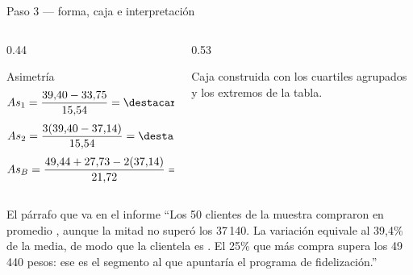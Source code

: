 \documentclass[aspectratio=169,10pt]{beamer}
\newcommand{\cajahor}[8]{%
  \draw[#8,thick] (#2*#1,#7) -- (#3*#1,#7);
  \draw[#8,thick] (#5*#1,#7) -- (#6*#1,#7);
  \draw[#8,thick] (#2*#1,#7-0.16) -- (#2*#1,#7+0.16);
  \draw[#8,thick] (#6*#1,#7-0.16) -- (#6*#1,#7+0.16);
  \draw[#8,thick,fill=#8!18] (#3*#1,#7-0.28) rectangle (#5*#1,#7+0.28);
  \draw[#8,very thick] (#4*#1,#7-0.28) -- (#4*#1,#7+0.28);
}
\begin{document}
\begin{frame}{Paso 3 — forma, caja e interpretación}
  \scriptsize
  \begin{columns}[T,onlytextwidth]
    \begin{column}{0.44\textwidth}
      \begin{block}{Asimetría}
        \scriptsize
        \[ As_1 = \frac{39{,}40-33{,}75}{15{,}54} = \destacar{0{,}364} \]
        \[ As_2 = \frac{3(39{,}40-37{,}14)}{15{,}54} = \destacar{0{,}436} \]
        \[ As_B = \frac{49{,}44+27{,}73-2(37{,}14)}{21{,}72}
                = \destacar{0{,}133} \]
      \end{block}
    \end{column}
    \begin{column}{0.53\textwidth}
      \centering
      {\tiny\color{uniGris} Caja construida con los cuartiles agrupados y los
      extremos de la tabla.}
    \end{column}
  \end{columns}

  \vspace{0.05cm}
  \begin{alertblock}{El párrafo que va en el informe}
    \tiny
    ``Los 50 clientes de la muestra compraron en promedio , aunque la mitad no superó los 37\,140. La variación equivale al
    39,4\% de la media, de modo que la clientela es
    . El 25\% que más compra supera los 49\,440
    pesos: ese es el segmento al que apuntaría el programa de fidelización.''
  \end{alertblock}
\end{frame}

\end{document}
